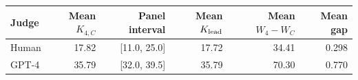 \begin{tabular}{lrrrrr}
\toprule
Judge & Mean $K_{4,C}$ & Panel interval & Mean $K_{\rm lead}$ & Mean $W_4-W_C$ & Mean gap \\
\midrule
Human & 17.82 & [11.0, 25.0] & 17.72 & 34.41 & 0.298 \\
GPT-4 & 35.79 & [32.0, 39.5] & 35.79 & 70.30 & 0.770 \\
\bottomrule
\end{tabular}
